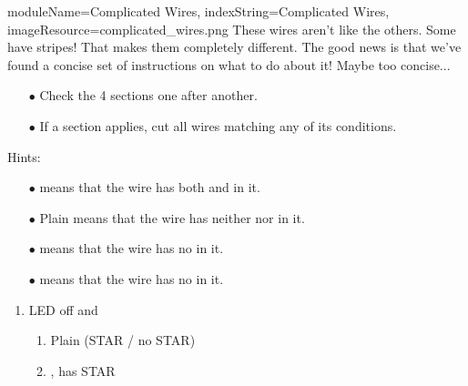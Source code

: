 \begin{module}{
  moduleName=Complicated Wires,
  indexString=Complicated Wires,
  imageResource=complicated_wires.png
}
{
  These wires aren't like the others. Some have stripes! That makes them completely different. The good news is that we've found a concise set of instructions on what to do about it! Maybe too concise...
}


\begin{itemize}
  \item[$\bullet$] Check the 4 sections one after another.
  \item[$\bullet$] If a section applies, cut all wires matching any of its conditions.
\end{itemize}

Hints:
\begin{itemize}
  \item[$\bullet$] \PURPLE means that the wire has both \RED and \BLUE in it.
  \item[$\bullet$] Plain \WHITE means that the wire has neither \RED nor \BLUE in it.
  \item[$\bullet$] \RED means that the wire has no \BLUE in it.
  \item[$\bullet$] \BLUE means that the wire has no \RED in it.
\end{itemize}

\begin{minipage}[t]{0.48\textwidth}
\begin{enumerate}
  \renewcommand{\labelenumi}{\alph{enumi}.}
  \item LED off and
  \begin{enumerate}
    \renewcommand{\labelenumii}{\roman{enumii}.}
    \item Plain \WHITE (STAR / no STAR)
    \item \RED, has STAR
  \end{enumerate}
\end{enumerate}


\end{minipage}
\end{module}
